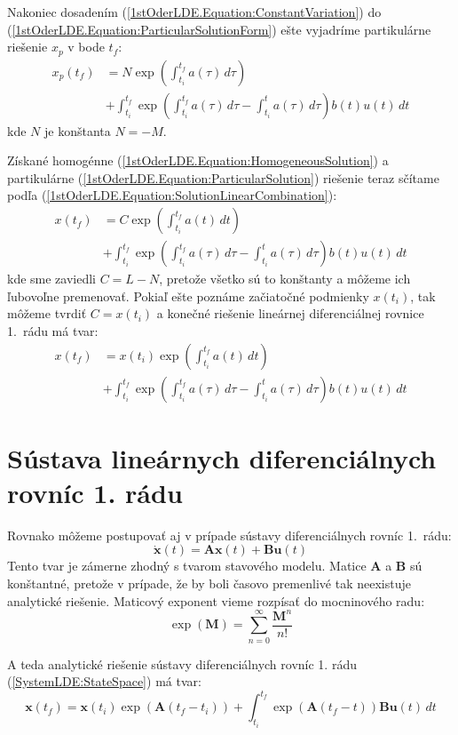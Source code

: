 \documentclass[a4paper, 10pt, ]{article}
\newcommand{\bm}[1]{\mathbf{#1}}
\theoremstyle{definition}
\begin{document}
\noindent Nakoniec dosadením (\ref{1stOderLDE.Equation:ConstantVariation}) do (\ref{1stOderLDE.Equation:ParticularSolutionForm}) ešte vyjadríme partikulárne riešenie $x_p$ v bode $t_f$:
\begin{align}
    \label{1stOderLDE.Equation:ParticularSolution}
    \nonumber
    x_p(t_f) &= 
    N \exp \left( \int_{t_i}^{t_f} a(\tau) \, d\tau \right) \\ &+ 
    \int_{t_i}^{t_f} \exp \left( \int_{t_i}^{t_f} a(\tau) \, d\tau - \int_{t_i}^{t} a(\tau) \, d\tau \right) b(t) u(t) \, dt
\end{align}
kde $N$ je konštanta $N = -M$.

Získané homogénne (\ref{1stOderLDE.Equation:HomogeneousSolution}) a partikulárne (\ref{1stOderLDE.Equation:ParticularSolution}) riešenie teraz sčítame podľa (\ref{1stOderLDE.Equation:SolutionLinearCombination}):
\begin{align}
    \nonumber
    x(t_f) &= 
    C \exp \left( \int_{t_i}^{t_f} a(t) \, dt \right) \\ &+
    \int_{t_i}^{t_f} \exp \left( \int_{t_i}^{t_f} a(\tau) \, d\tau - \int_{t_i}^{t} a(\tau) \, d\tau \right) b(t) u(t) \, dt
\end{align}
kde sme zaviedli $C = L - N$, pretože všetko sú to konštanty a môžeme ich ľubovoľne premenovať. Pokiaľ ešte poznáme začiatočné podmienky $x(t_i)$, tak môžeme tvrdiť $C = x(t_i)$ a konečné riešenie lineárnej diferenciálnej rovnice 1.~rádu má tvar:
\begin{align}
    \nonumber
    x(t_f) &= 
    x(t_i) \exp \left( \int_{t_i}^{t_f} a(t) \, dt \right) \\ &+
    \int_{t_i}^{t_f} \exp \left( \int_{t_i}^{t_f} a(\tau) \, d\tau - \int_{t_i}^{t} a(\tau) \, d\tau \right) b(t) u(t) \, dt 
\end{align}



\section{Sústava lineárnych diferenciálnych rovníc 1. rádu}

Rovnako môžeme postupovať aj v prípade sústavy diferenciálnych rovníc 1.~rádu:
\begin{equation}
    \label{SystemLDE:StateSpace}
    \dot{\bm{x}}(t) = \bm{A} \bm{x}(t) + \bm{B} \bm{u}(t)
\end{equation}
Tento tvar je zámerne zhodný s tvarom stavového modelu. Matice $\bm{A}$ a $\bm{B}$ sú konštantné, pretože v prípade, že by boli časovo premenlivé tak neexistuje analytické riešenie. Maticový exponent vieme rozpísať do mocninového radu:
\begin{equation}
    \exp(\bm{M}) = \sum_{n = 0}^{\infty} \frac{\bm{M}^n}{n!}
\end{equation}

A teda analytické riešenie sústavy diferenciálnych rovníc 1. rádu (\ref{SystemLDE:StateSpace}) má tvar:
\begin{equation}
    \bm{x}(t_f) = 
    \bm{x}(t_i) \exp \left( \bm{A} (t_f - t_i) \right) + 
    \int_{t_i}^{t_f} \exp \left( \bm{A} (t_f - t) \right) \bm{B} \bm{u}(t) \, dt 
\end{equation}
\end{document}
